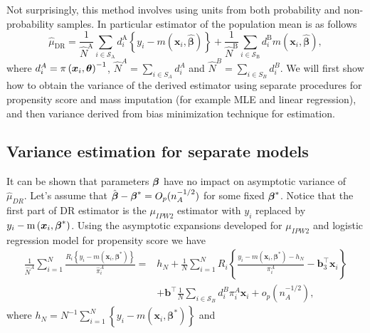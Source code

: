 \documentclass[
  letterpaper,
  DIV=11,
  numbers=noendperiod]{scrreprt}
\begin{document}
Not surprisingly, this method involves using units from both probability
and non-probability samples. In particular estimator of the population
mean is as follows \[
\begin{equation*}
    \hat{\mu}_{\mathrm{DR}}=\frac{1}{\hat{N}^{\mathrm{A}}} \sum_{i \in \mathcal{S}_{\mathrm{A}}} d_i^{\mathrm{A}}\left\{y_i-m\left(\boldsymbol{x}_i, \hat{\boldsymbol{\beta}}\right)\right\}+\frac{1}{\hat{N}^{\mathrm{B}}} \sum_{i \in \mathcal{S}_{\mathrm{B}}} d_i^{\mathrm{B}} m\left(\boldsymbol{x}_i, \hat{\boldsymbol{\beta}}\right),
\end{equation*}
\] where \(d_i^A = \pi \left(\boldsymbol{x}_i, \boldsymbol{\theta}\right)^{-1}\),
\(\hat{N}^A = \sum_{i \in S_A} d_i^A\) and
\(\hat{N}^B = \sum_{i \in S_B} d_i^B\). We will first show how to obtain
the variance of the derived estimator using separate procedures for
propensity score and mass imputation (for example MLE and linear
regression), and then variance derived from bias minimization technique
for estimation.

\subsection{Variance estimation for separate
models}\label{variance-estimation-for-separate-models}

It can be shown that parameters \(\boldsymbol{\beta}\) have no impact on asymptotic
variance of \(\hat{\mu}_{DR}\). Let's assume that
\(\hat{\boldsymbol{\beta}} - \boldsymbol{\beta}^* = O_p(n_A^{-1/2})\) for some fixed
\(\boldsymbol{\beta}^*\). Notice that the first part of DR estimator is the
\(\mu_{IPW2}\) estimator with \(y_i\) replaced by
\(y_i - \operatorname{m}\left(\boldsymbol{x}_i,\boldsymbol{\beta}^*\right)\). Using the
asymptotic expansions developed for \(\mu_{IPW2}\) and logistic
regression model for propensity score we have \[
\begin{equation}
\begin{aligned}
\frac{1}{\hat{N}^A} \sum_{i=1}^N \frac{R_i\left\{y_i-m\left(\boldsymbol{x}_i, \boldsymbol{\beta}^*\right)\right\}}{\hat{\pi}_i^A}= & h_N+\frac{1}{N} \sum_{i=1}^N R_i\left\{\frac{y_i-m\left(\boldsymbol{x}_i, \boldsymbol{\beta}^*\right)-h_N}{\pi_i^A}-\mathbf{b}_3^{\top} \boldsymbol{x}_i\right\} \\
& +\mathbf{b}^{\top} \frac{1}{N} \sum_{i \in \mathcal{S}_B} d_i^B \pi_i^A \boldsymbol{x}_i+o_p\left(n_A^{-1 / 2}\right),
\end{aligned}
\end{equation}
\] where
\(h_N=N^{-1} \sum_{i=1}^N\left\{y_i-m\left(\boldsymbol{x}_i, \boldsymbol{\beta}^*\right)\right\}\)
and
\end{document}

